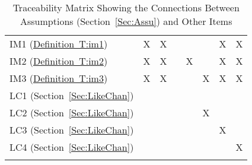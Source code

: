 \documentclass[12pt]{article}
\begin{document}
\begin{longtable}{l l l l l l l l}
\\
IM1 (\hyperref[T:im1]{Definition~T:im1}) & X & X &  &  &  & X & X
\\
IM2 (\hyperref[T:im2]{Definition~T:im2}) & X & X &  & X &  & X & X
\\
IM3 (\hyperref[T:im3]{Definition~T:im3}) & X & X &  &  & X & X & X
\\
LC1 (Section~\ref{Sec:LikeChan}) &  &  &  &  &  &  & 
\\
LC2 (Section~\ref{Sec:LikeChan}) &  &  &  &  & X &  & 
\\
LC3 (Section~\ref{Sec:LikeChan}) &  &  &  &  &  & X & 
\\
LC4 (Section~\ref{Sec:LikeChan}) &  &  &  &  &  &  & X
\\
\bottomrule
\caption{Traceability Matrix Showing the Connections Between Assumptions (Section~\ref{Sec:Assu}) and Other Items}
\label{Table:TracMatrShowtheConnBetwAssu()andOtheItem}
\end{longtable}
\end{document}
